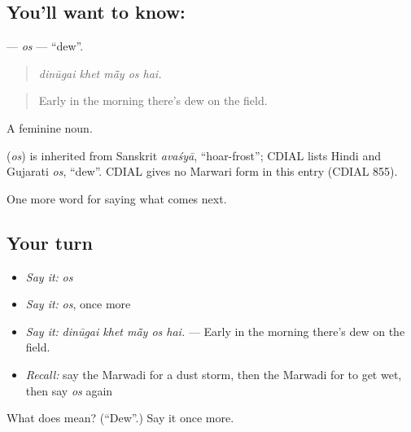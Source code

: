 \subsection*{You'll want to know: }
\textbf{} — \emph{os} — \textquotedblleft{}dew\textquotedblright{}.

\begin{quote}
    
\end{quote}

\begin{quote}
\emph{dinūgai khet mā̃y os hai.}
\end{quote}

\begin{quote}
Early in the morning there's dew on the field.
\end{quote}

A feminine noun.

\begin{cousinweb}
\textbf{} (\emph{os}) is inherited from Sanskrit \emph{avaśyā}, \textquotedblleft{}hoar-frost\textquotedblright{}; CDIAL lists Hindi and Gujarati \emph{os}, \textquotedblleft{}dew\textquotedblright{}. CDIAL gives no Marwari form in this entry (CDIAL 855).
\end{cousinweb}

\begin{grammarlens}[title={What you've built}]
One more word for saying what comes next.
\end{grammarlens}

\subsection*{Your turn}
\begin{itemize}
\raggedright
  \item \emph{Say it:} \emph{os}
  \item \emph{Say it:} \emph{os}, once more
  \item \emph{Say it:} \emph{dinūgai khet mā̃y os hai.} — Early in the morning there's dew on the field.
  \item \emph{Recall:} say the Marwadi for a dust storm, then the Marwadi for to get wet, then say \emph{os} again
\end{itemize}

\begin{tcolorbox}[breakable,colback=teal!4,colframe=teal!35!black,title={Before you move on}]
What does  mean? (\textquotedblleft{}Dew\textquotedblright{}.) Say it once more.
\end{tcolorbox}
